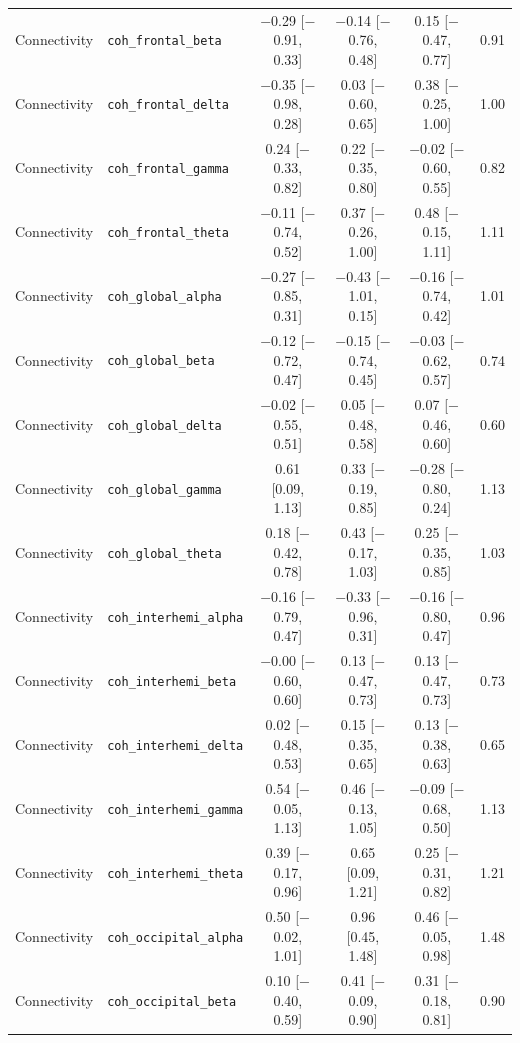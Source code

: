 {\begin{longtable}{llcccc}
Connectivity & \texttt{coh\_frontal\_beta} & $-$0.29 [$-$0.91, 0.33] & $-$0.14 [$-$0.76, 0.48] & 0.15 [$-$0.47, 0.77] & 0.91 \\
Connectivity & \texttt{coh\_frontal\_delta} & $-$0.35 [$-$0.98, 0.28] & 0.03 [$-$0.60, 0.65] & 0.38 [$-$0.25, 1.00] & 1.00 \\
Connectivity & \texttt{coh\_frontal\_gamma} & 0.24 [$-$0.33, 0.82] & 0.22 [$-$0.35, 0.80] & $-$0.02 [$-$0.60, 0.55] & 0.82 \\
Connectivity & \texttt{coh\_frontal\_theta} & $-$0.11 [$-$0.74, 0.52] & 0.37 [$-$0.26, 1.00] & 0.48 [$-$0.15, 1.11] & 1.11 \\
Connectivity & \texttt{coh\_global\_alpha} & $-$0.27 [$-$0.85, 0.31] & $-$0.43 [$-$1.01, 0.15] & $-$0.16 [$-$0.74, 0.42] & 1.01 \\
Connectivity & \texttt{coh\_global\_beta} & $-$0.12 [$-$0.72, 0.47] & $-$0.15 [$-$0.74, 0.45] & $-$0.03 [$-$0.62, 0.57] & 0.74 \\
Connectivity & \texttt{coh\_global\_delta} & $-$0.02 [$-$0.55, 0.51] & 0.05 [$-$0.48, 0.58] & 0.07 [$-$0.46, 0.60] & 0.60 \\
Connectivity & \texttt{coh\_global\_gamma} & 0.61 [0.09, 1.13] & 0.33 [$-$0.19, 0.85] & $-$0.28 [$-$0.80, 0.24] & 1.13 \\
Connectivity & \texttt{coh\_global\_theta} & 0.18 [$-$0.42, 0.78] & 0.43 [$-$0.17, 1.03] & 0.25 [$-$0.35, 0.85] & 1.03 \\
Connectivity & \texttt{coh\_interhemi\_alpha} & $-$0.16 [$-$0.79, 0.47] & $-$0.33 [$-$0.96, 0.31] & $-$0.16 [$-$0.80, 0.47] & 0.96 \\
Connectivity & \texttt{coh\_interhemi\_beta} & $-$0.00 [$-$0.60, 0.60] & 0.13 [$-$0.47, 0.73] & 0.13 [$-$0.47, 0.73] & 0.73 \\
Connectivity & \texttt{coh\_interhemi\_delta} & 0.02 [$-$0.48, 0.53] & 0.15 [$-$0.35, 0.65] & 0.13 [$-$0.38, 0.63] & 0.65 \\
Connectivity & \texttt{coh\_interhemi\_gamma} & 0.54 [$-$0.05, 1.13] & 0.46 [$-$0.13, 1.05] & $-$0.09 [$-$0.68, 0.50] & 1.13 \\
Connectivity & \texttt{coh\_interhemi\_theta} & 0.39 [$-$0.17, 0.96] & 0.65 [0.09, 1.21] & 0.25 [$-$0.31, 0.82] & 1.21 \\
Connectivity & \texttt{coh\_occipital\_alpha} & 0.50 [$-$0.02, 1.01] & 0.96 [0.45, 1.48] & 0.46 [$-$0.05, 0.98] & 1.48 \\
Connectivity & \texttt{coh\_occipital\_beta} & 0.10 [$-$0.40, 0.59] & 0.41 [$-$0.09, 0.90] & 0.31 [$-$0.18, 0.81] & 0.90 \\

\end{longtable}}
